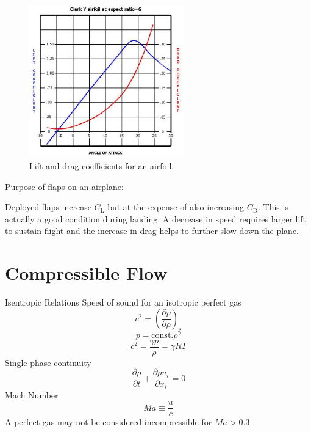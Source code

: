 \documentclass{article}
\begin{document}
\begin{figure}[!ht]
\centering
\includegraphics[width=0.6\textwidth]{./Figures/Lift_drag_graph}
\caption{Lift and drag coefficients for an airfoil.}
\end{figure}
\newline
\newline
Purpose of flaps on an airplane:

Deployed flaps increase $C_\text{L}$ but at the expense of also increasing $C_\text{D}$. This is actually a good condition during landing. A decrease in speed requires larger lift to sustain flight and the increase in drag helps to further slow down the plane.
\clearpage

%
%
\newpage
\section{Compressible Flow}

Isentropic Relations
\newline
\newline
Speed of sound for an isotropic perfect gas
\begin{equation}
  c^2 = \left(\frac{\partial p}{\partial \rho}\right)_s
\end{equation}
\begin{equation}
  p = \text{const.} \rho^\gamma
\end{equation}
\begin{equation}
  c^2 = \frac{\gamma p}{\rho} = \gamma R T
\end{equation}
\newline
\newline
Single-phase continuity
\begin{equation}
  \frac{\partial \rho}{\partial t} + \frac{\partial \rho u_i}{\partial x_i} = 0
\end{equation}
\newline
\newline
Mach Number
\begin{equation}
  Ma \equiv \frac{u}{c}
\end{equation}
\newline
\newline
A perfect gas may not be considered incompressible for $Ma > 0.3$.
\end{document}
